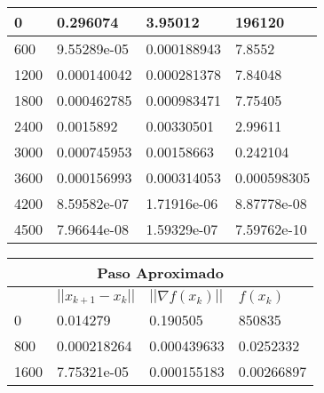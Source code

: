 \documentclass{article}
\begin{document}
\begin{enumerate}
\begin{table}[ht]
{\begin{tabular}{llll}
  \multicolumn{1}{|l|}{0} & \multicolumn{1}{l|}{0.296074} & \multicolumn{1}{l|}{3.95012}  &\multicolumn{1}{l|}{196120} \\ \hline
  \multicolumn{1}{|l|}{600} & \multicolumn{1}{l|}{9.55289e-05}  & \multicolumn{1}{l|}{0.000188943}  & \multicolumn{1}{l|}{7.8552} \\ \hline
  \multicolumn{1}{|l|}{1200}  & \multicolumn{1}{l|}{0.000140042}  & \multicolumn{1}{l|}{0.000281378}  & \multicolumn{1}{l|}{7.84048} \\ \hline
  \multicolumn{1}{|l|}{1800}  & \multicolumn{1}{l|}{0.000462785}  & \multicolumn{1}{l|}{0.000983471}  & \multicolumn{1}{l|}{7.75405} \\ \hline
  \multicolumn{1}{|l|}{2400}  & \multicolumn{1}{l|}{0.0015892}  & \multicolumn{1}{l|}{0.00330501} & \multicolumn{1}{l|}{2.99611} \\ \hline
  \multicolumn{1}{|l|}{3000}  & \multicolumn{1}{l|}{0.000745953}  & \multicolumn{1}{l|}{0.00158663} & \multicolumn{1}{l|}{0.242104} \\ \hline
  \multicolumn{1}{|l|}{3600}  & \multicolumn{1}{l|}{0.000156993}  & \multicolumn{1}{l|}{0.000314053}  & \multicolumn{1}{l|}{0.000598305} \\ \hline
  \multicolumn{1}{|l|}{4200}  & \multicolumn{1}{l|}{8.59582e-07}  & \multicolumn{1}{l|}{1.71916e-06}  & \multicolumn{1}{l|}{8.87778e-08} \\ \hline
  \multicolumn{1}{|l|}{4500}  & \multicolumn{1}{l|}{7.96644e-08}  & \multicolumn{1}{l|}{1.59329e-07}  & \multicolumn{1}{l|}{7.59762e-10} \\ \hline
  \end{tabular}
  \begin{tabular}{llll}
  \multicolumn{4}{c}{Paso Aproximado} \\ \hline
  \rowcolor[HTML]{DBDBDB} 
  \multicolumn{1}{|l|}{\cellcolor[HTML]{DBDBDB}k} & \multicolumn{1}{l|}{\cellcolor[HTML]{DBDBDB}$||x_{k+1} - x_k||$} & \multicolumn{1}{l|}{\cellcolor[HTML]{DBDBDB}$||\nabla f (x_k )||$}       & \multicolumn{1}{l|}{\cellcolor[HTML]{DBDBDB}$f(x_k)$} \\ \hline
  \multicolumn{1}{|l|}{0} & \multicolumn{1}{l|}{0.014279} & \multicolumn{1}{l|}{0.190505} &\multicolumn{1}{l|}{850835} \\ \hline
  \multicolumn{1}{|l|}{800} & \multicolumn{1}{l|}{0.000218264}  & \multicolumn{1}{l|}{0.000439633}  & \multicolumn{1}{l|}{0.0252332} \\ \hline
  \multicolumn{1}{|l|}{1600}  & \multicolumn{1}{l|}{7.75321e-05}  & \multicolumn{1}{l|}{0.000155183}  & \multicolumn{1}{l|}{0.00266897} \\ \hline

\end{tabular}}
\end{table}
\end{enumerate}
\end{document}
